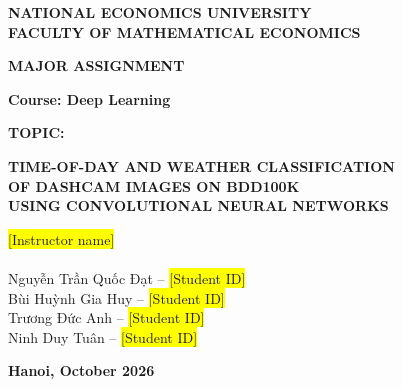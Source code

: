 \documentclass[12pt,letterpaper]{article}
\begin{document}
\begin{titlepage}
\centering
\vspace*{0.2in}
{\large\bfseries NATIONAL ECONOMICS UNIVERSITY\\[4pt] FACULTY OF MATHEMATICAL ECONOMICS\par}
\vspace{1.3in}
{\Large\bfseries MAJOR ASSIGNMENT\par}
\vspace{6pt}
{\large\bfseries Course: Deep Learning\par}
\vspace{0.6in}
{\LARGE\bfseries TOPIC:\par}
\vspace{14pt}
{\large\bfseries TIME-OF-DAY AND WEATHER CLASSIFICATION\\ OF DASHCAM IMAGES ON BDD100K\\
USING CONVOLUTIONAL NEURAL NETWORKS\par}
\vspace{0.7in}
\begin{flushleft}
\hspace*{0.9in}{\large\bfseries Instructor:} {\large\colorbox{yellow}{[Instructor name]}}\\[12pt]
\hspace*{0.9in}{\large\bfseries Students:}\\[4pt]
\large
\hspace*{0.9in}Nguyễn Trần Quốc Đạt -- \colorbox{yellow}{[Student ID]}\\
\hspace*{0.9in}Bùi Huỳnh Gia Huy -- \colorbox{yellow}{[Student ID]}\\
\hspace*{0.9in}Trương Đức Anh -- \colorbox{yellow}{[Student ID]}\\
\hspace*{0.9in}Ninh Duy Tuân -- \colorbox{yellow}{[Student ID]}
\end{flushleft}
\vfill
{\large\bfseries Hanoi, October 2026\par}
\vspace*{0.15in}
\end{titlepage}
\end{document}
